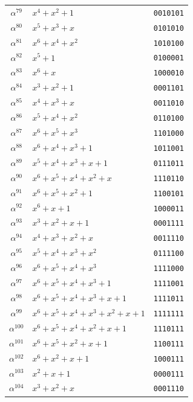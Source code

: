 \documentclass[10pt,a4paper]{article}
\begin{document}
\begin{longtable}{@{}c l c@{}}
    $\alpha^{79}$ & $x^{4}+x^{2}+1$ & \texttt{0010101} \\
    $\alpha^{80}$ & $x^{5}+x^{3}+x$ & \texttt{0101010} \\
    $\alpha^{81}$ & $x^{6}+x^{4}+x^{2}$ & \texttt{1010100} \\
    $\alpha^{82}$ & $x^{5}+1$ & \texttt{0100001} \\
    $\alpha^{83}$ & $x^{6}+x$ & \texttt{1000010} \\
    $\alpha^{84}$ & $x^{3}+x^{2}+1$ & \texttt{0001101} \\
    $\alpha^{85}$ & $x^{4}+x^{3}+x$ & \texttt{0011010} \\
    $\alpha^{86}$ & $x^{5}+x^{4}+x^{2}$ & \texttt{0110100} \\
    $\alpha^{87}$ & $x^{6}+x^{5}+x^{3}$ & \texttt{1101000} \\
    $\alpha^{88}$ & $x^{6}+x^{4}+x^{3}+1$ & \texttt{1011001} \\
    $\alpha^{89}$ & $x^{5}+x^{4}+x^{3}+x+1$ & \texttt{0111011} \\
    $\alpha^{90}$ & $x^{6}+x^{5}+x^{4}+x^{2}+x$ & \texttt{1110110} \\
    $\alpha^{91}$ & $x^{6}+x^{5}+x^{2}+1$ & \texttt{1100101} \\
    $\alpha^{92}$ & $x^{6}+x+1$ & \texttt{1000011} \\
    $\alpha^{93}$ & $x^{3}+x^{2}+x+1$ & \texttt{0001111} \\
    $\alpha^{94}$ & $x^{4}+x^{3}+x^{2}+x$ & \texttt{0011110} \\
    $\alpha^{95}$ & $x^{5}+x^{4}+x^{3}+x^{2}$ & \texttt{0111100} \\
    $\alpha^{96}$ & $x^{6}+x^{5}+x^{4}+x^{3}$ & \texttt{1111000} \\
    $\alpha^{97}$ & $x^{6}+x^{5}+x^{4}+x^{3}+1$ & \texttt{1111001} \\
    $\alpha^{98}$ & $x^{6}+x^{5}+x^{4}+x^{3}+x+1$ & \texttt{1111011} \\
    $\alpha^{99}$ & $x^{6}+x^{5}+x^{4}+x^{3}+x^{2}+x+1$ & \texttt{1111111} \\
    $\alpha^{100}$ & $x^{6}+x^{5}+x^{4}+x^{2}+x+1$ & \texttt{1110111} \\
    $\alpha^{101}$ & $x^{6}+x^{5}+x^{2}+x+1$ & \texttt{1100111} \\
    $\alpha^{102}$ & $x^{6}+x^{2}+x+1$ & \texttt{1000111} \\
    $\alpha^{103}$ & $x^{2}+x+1$ & \texttt{0000111} \\
    $\alpha^{104}$ & $x^{3}+x^{2}+x$ & \texttt{0001110} \\

\end{longtable}
\end{document}
